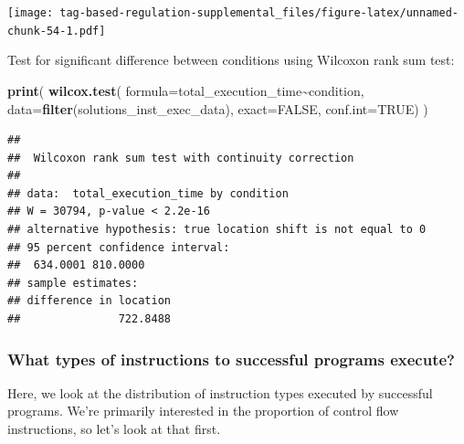 \documentclass[
]{book}
\newenvironment{Shaded}{\begin{snugshade}}{\end{snugshade}}
\newcommand{\DataTypeTok}[1]{\textcolor[rgb]{0.13,0.29,0.53}{#1}}
\newcommand{\KeywordTok}[1]{\textcolor[rgb]{0.13,0.29,0.53}{\textbf{#1}}}
\newcommand{\NormalTok}[1]{#1}
\newcommand{\OperatorTok}[1]{\textcolor[rgb]{0.81,0.36,0.00}{\textbf{#1}}}
\newcommand{\OtherTok}[1]{\textcolor[rgb]{0.56,0.35,0.01}{#1}}
\begin{document}
\texttt{[image: tag-based-regulation-supplemental\_files/figure-latex/unnamed-chunk-54-1.pdf]}

Test for significant difference between conditions using Wilcoxon rank sum test:

\begin{Shaded}
\begin{Highlighting}[]
\KeywordTok{print}\NormalTok{(}
  \KeywordTok{wilcox.test}\NormalTok{(}
    \DataTypeTok{formula=}\NormalTok{total\_execution\_time}\OperatorTok{\textasciitilde{}}\NormalTok{condition,}
    \DataTypeTok{data=}\KeywordTok{filter}\NormalTok{(solutions\_inst\_exec\_data),}
    \DataTypeTok{exact=}\OtherTok{FALSE}\NormalTok{,}
    \DataTypeTok{conf.int=}\OtherTok{TRUE}\NormalTok{)}
\NormalTok{)}
\end{Highlighting}
\end{Shaded}

\begin{verbatim}
## 
##  Wilcoxon rank sum test with continuity correction
## 
## data:  total_execution_time by condition
## W = 30794, p-value < 2.2e-16
## alternative hypothesis: true location shift is not equal to 0
## 95 percent confidence interval:
##  634.0001 810.0000
## sample estimates:
## difference in location 
##               722.8488
\end{verbatim}

\hypertarget{what-types-of-instructions-to-successful-programs-execute}{%
\subsubsection{What types of instructions to successful programs execute?}\label{what-types-of-instructions-to-successful-programs-execute}}

Here, we look at the distribution of instruction types executed by successful programs.
We're primarily interested in the proportion of control flow instructions, so let's look at that first.
\end{document}
